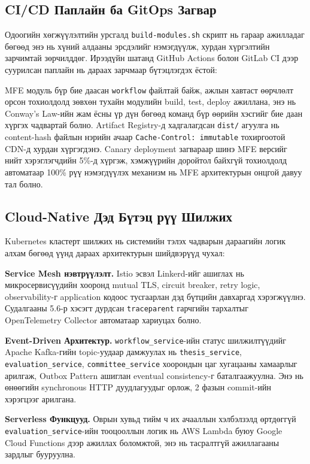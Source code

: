 \subsection{CI/CD Паплайн ба GitOps Загвар}

Одоогийн хөгжүүлэлтийн урсгалд \texttt{build-modules.sh} скрипт нь гараар
ажилладаг бөгөөд энэ нь хүний алдааны эрсдэлийг нэмэгдүүлж, хурдан
хүргэлтийн зарчимтай зөрчилддөг. Ирээдүйн шатанд GitHub Actions болон
GitLab CI дээр суурилсан паплайн нь дараах зарчмаар бүтэцлэгдэх ёстой:

MFE модуль бүр бие даасан \texttt{workflow} файлтай байж, ажлын хавтаст
өөрчлөлт орсон тохиолдолд зөвхөн тухайн модулийн build, test, deploy
ажиллана, энэ нь Conway's Law-ийн жам ёсны үр дүн бөгөөд команд
бүр өөрийн хэсгийг бие даан хүргэх чадвартай болно. Artifact Registry-д
хадгалагдсан \texttt{dist/} агуулга нь content-hash файлын нэрийн ачаар
\texttt{Cache-Control: immutable} тохиргоотой CDN-д хурдан хүргэгдэнэ.
Canary deployment загвараар шинэ MFE версийг нийт хэрэглэгчдийн 5\%-д
хүргэж, хэмжүүрийн доройтол байхгүй тохиолдолд автоматаар 100\% рүү
нэмэгдүүлэх механизм нь MFE архитектурын онцгой давуу тал болно.

\subsection{Cloud-Native Дэд Бүтэц рүү Шилжих}

Kubernetes кластерт шилжих нь системийн тэлэх чадварын дараагийн логик
алхам бөгөөд үүнд дараах архитектурын шийдвэрүүд чухал:

\textbf{Service Mesh нэвтрүүлэлт.} Istio эсвэл Linkerd-ийг ашиглах нь
микросервисүүдийн хооронд mutual TLS, circuit breaker, retry logic,
observability-г application кодоос тусгаарлан дэд бүтцийн давхаргад
хэрэгжүүлнэ. Судалгааны 5.6-р хэсэгт дурдсан \texttt{traceparent}
гарчгийн тархалтыг OpenTelemetry Collector автоматаар хариуцах болно.

\textbf{Event-Driven Архитектур.} \texttt{workflow\_service}-ийн статус
шилжилтүүдийг Apache Kafka-гийн topic-уудаар дамжуулах нь
\texttt{thesis\_service}, \texttt{evaluation\_service},
\texttt{committee\_service} хоорондын цаг хугацааны хамаарлыг арилгаж,
Outbox Pattern ашиглан eventual consistency-г баталгаажуулна. Энэ нь
өнөөгийн synchronous HTTP дуудлагуудыг орлож, 2 фазын commit-ийн
хэрэгцээг арилгана.

\textbf{Serverless Функцууд.} Оврын хувьд тийм ч их ачааллын хэлбэлзэлд
өртдөггүй \texttt{evaluation\_service}-ийн тооцооллын логик нь AWS Lambda
буюу Google Cloud Functions дээр ажиллах боломжтой, энэ нь тасралтгүй
ажиллагааны зардлыг бууруулна.

